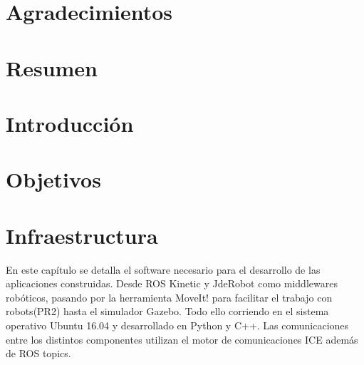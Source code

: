 \documentclass[12pt,spanish,chapterprefix, numbers=noenddot]{book}
\numberwithin{equation}{section}
\numberwithin{figure}{section}
\begin{document}
\chapter*{Agradecimientos}

\chapter*{Resumen}

\mainmatter

\chapter{Introducción}
\section{}
\section{}
\subsection{}
\subsection{}

\chapter{Objetivos}
\section{}

\chapter{Infraestructura}

En este capítulo se detalla el software necesario para el desarrollo de las aplicaciones construidas. Desde ROS Kinetic y JdeRobot como middlewares robóticos, pasando por la herramienta MoveIt! para facilitar el trabajo con robots(PR2) hasta el simulador Gazebo. Todo ello corriendo en el sistema operativo Ubuntu 16.04 y desarrollado en Python y C++.  Las comunicaciones entre los distintos componentes utilizan el motor de comunicaciones ICE además de ROS topics. 
\end{document}
